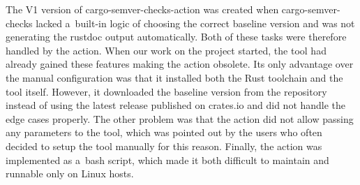 \documentclass[licencjacka,en]{pracamgr}
\begin{document}
The V1 version of cargo-semver-checks-action was created when
cargo-semver-checks lacked a~built-in logic of choosing the correct baseline version and was not
generating the rustdoc output automatically. Both of these tasks were therefore handled
by the action. When our work on the project started, the tool had already gained these features
making the action obsolete. Its only advantage over the manual configuration was that it installed
both the Rust toolchain and the tool itself. However, it downloaded the baseline version from
the repository instead of using the latest release published on crates.io and did not handle
the edge cases properly. The other problem was that the action did not allow passing any parameters
to the tool, which was pointed out by the users who often decided to setup the tool manually
for this reason. Finally, the action was implemented as a~bash script, which made it both difficult
to maintain and runnable only on Linux hosts.
\end{document}

